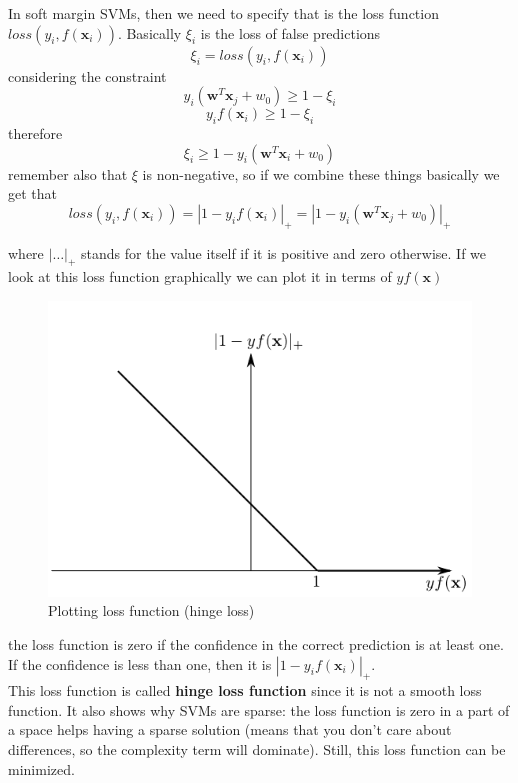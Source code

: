     In soft margin SVMs, then we need to specify that is the loss function $loss(y_i, f(\pmb{x}_i))$. 
    Basically $\xi_i$ is the loss of false predictions
    $$\xi_i = loss(y_i, f(\pmb{x}_i))$$
    considering the constraint
    $$y_i(\pmb{w}^T \pmb{x}_j + w_0) \geq 1 - \xi_i$$
    $$y_i f(\pmb{x}_i) \geq 1 - \xi_i$$
    therefore 
    $$\xi_i \geq 1 - y_i (\pmb{w}^T \pmb{x}_i + w_0)$$
    remember also that $\xi$ is non-negative, so if we combine these things basically we get that 
    \begin{equation}
        loss(y_i, f(\pmb{x}_i)) = |1 - y_i f(\pmb{x}_i)|_{+} = |1 - y_i(\pmb{w}^T \pmb{x}_j + w_0)|_{+}
    \end{equation}
    
    where $|\dots|_{+}$ stands for the value itself if it is positive and zero otherwise.
    If we look at this loss function graphically we can plot it in terms of $y f(\pmb{x})$
    \begin{figure}[ht]
        \centering
        \includegraphics[scale=0.5]{images/loss_fun_plot_SVMs.png}
        \caption{Plotting loss function (hinge loss)}
        \label{fig:plot_loss_fun}
    \end{figure}
    the loss function is zero if the confidence in the correct prediction is at least one. If the confidence is less than one, then it is $|1 - y_i f(\pmb{x}_i)|_{+}$.\\
    This loss function is called \textbf{hinge loss function} since it is not a smooth loss function. 
    It also shows why SVMs are sparse: the loss function is zero in a part of a space helps having a sparse solution (means that you don't care about differences, so the complexity term will dominate). 
    Still, this loss function can be minimized. 

